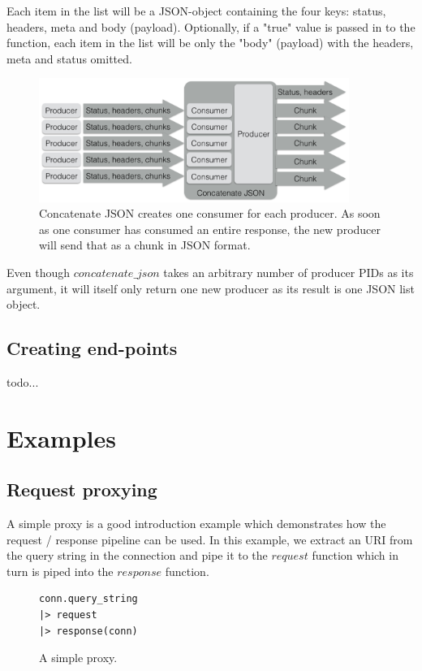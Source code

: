 \documentclass{cslthse-msc}
\begin{document}
Each item in the list will be a JSON-object containing the four keys: status, headers, meta and body (payload). Optionally, if a "true" value is passed in to the function, each item in the list will be only the "body" (payload) with the headers, meta and status omitted.


\begin{figure}[H]
  \centering
    \begin{center}
      \includegraphics[width=0.9\textwidth]{images/crocpear_concatenate_json.png}
    \end{center}
  \caption{Concatenate JSON creates one consumer for each producer. As soon as one consumer has consumed an entire response, the new producer will send that as a chunk in JSON format.}
\end{figure}

Even though $concatenate\_json$ takes an arbitrary number of producer PIDs as its argument, it will itself only return one new producer as its result is one JSON list object.

\subsection{Creating end-points}
todo...

\section{Examples}
\subsection{Request proxying}
A simple proxy is a good introduction example which demonstrates how the request / response pipeline can be used. In this example, we extract an URI from the query string in the connection and pipe it to the $request$ function which in turn is piped into the $response$ function.

\begin{figure}[H]
  \centering
\begin{lstlisting}[breaklines=true,frame=single]
conn.query_string
|> request
|> response(conn)
\end{lstlisting}
  \caption{A simple proxy.}
\end{figure}
\end{document}
